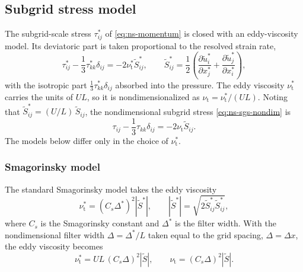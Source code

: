 \documentclass{article}
\begin{document}
\subsection{Subgrid stress model}\label{ssec:ns-viscosity}
The subgrid-scale stress $\tau_{ij}^*$ of \eqref{eq:ns-momentum} is closed with
an eddy-viscosity model. Its deviatoric part is taken proportional to the
resolved strain rate,
\begin{equation}\label{eq:ns-eddy-closure}
  \tau_{ij}^* - \frac{1}{3}\tau_{kk}^*\delta_{ij} = -2\nu_{\mathrm{t}}^* \tilde S_{ij}^*,
  \qquad
  \tilde S_{ij}^* = \frac{1}{2}\left(\frac{\partial \tilde u_i^*}{\partial x_j^*} + \frac{\partial \tilde u_j^*}{\partial x_i^*}\right),
\end{equation}
with the isotropic part $\frac{1}{3}\tau_{kk}^*\delta_{ij}$ absorbed into the
pressure. The eddy viscosity $\nu_{\mathrm{t}}^*$ carries the units of $UL$, so
it is nondimensionalized as $\nu_{\mathrm{t}} = \nu_{\mathrm{t}}^*/(UL)$. Noting
that $\tilde S_{ij}^* = (U/L)\, \tilde S_{ij}$, the nondimensional subgrid stress
\eqref{eq:ns-sgs-nondim} is
\begin{equation}\label{eq:ns-eddy-closure-nondim}
  \tau_{ij} - \frac{1}{3}\tau_{kk}\delta_{ij} = -2 \nu_{\mathrm{t}} \tilde S_{ij}.
\end{equation}
The models below differ only in the choice of $\nu_{\mathrm{t}}^*$.

\subsubsection{Smagorinsky model}\label{sssec:ns-sgs-smagorinsky}
The standard Smagorinsky model takes the eddy viscosity
\begin{equation}\label{eq:ns-eddy-viscosity}
  \nu_{\mathrm{t}}^* = (C_s \Delta^*)^2 |\tilde S^*|,
  \qquad
  |\tilde S^*| = \sqrt{2 \tilde S_{ij}^* \tilde S_{ij}^*},
\end{equation}
where $C_s$ is the Smagorinsky constant and $\Delta^*$ is the filter width.
With the nondimensional filter width $\Delta = \Delta^*/L$ taken equal to the
grid spacing, $\Delta = \Delta x$, the eddy viscosity
becomes
\begin{equation}\label{eq:ns-eddy-viscosity-nondim}
  \nu_{\mathrm{t}}^* = U L\, (C_s \Delta)^2 |\tilde S|,
  \qquad
  \nu_{\mathrm{t}} = (C_s \Delta)^2 |\tilde S|.
\end{equation}
\end{document}
